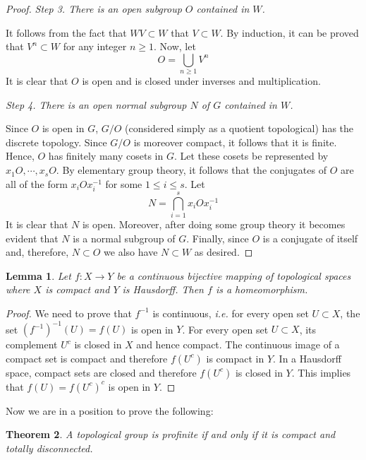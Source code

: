 \documentclass[12pt]{article}
\newtheorem{thm}{Theorem}[section]
\newtheorem{lem}[thm]{Lemma}
\theoremstyle{definition}
\theoremstyle{remark}
\begin{document}
\begin{proof}
        \noindent\emph{Step 3. There is an open subgroup $O$ contained in $W$.}

        It follows from the fact that $WV \subset W$ that $V \subset W$. By induction, it can be proved that $V^n \subset W$ for any integer $n \geq 1$. Now, let
        $$ O = \bigcup_{n\geq 1} V^n $$
        It is clear that $O$ is open and is closed under inverses and multiplication.

        \noindent\emph{Step 4. There is an open normal subgroup $N$ of $G$ contained in $W$.}
        
        Since $O$ is open in $G$, $G/O$ (considered simply as a quotient topological) has the discrete topology. Since $G/O$ is moreover compact, it follows that it is finite. Hence, $O$ has finitely many cosets in $G$. Let these cosets be represented by $x_1O,\cdots,x_sO$. By elementary group theory, it follows that the conjugates of $O$ are all of the form $x_iOx_i^{-1}$ for some $1\leq i\leq s$. Let
        $$ N = \bigcap_{i=1}^s x_iOx_i^{-1} $$
        It is clear that $N$ is open. Moreover, after doing some group theory it becomes evident that $N$ is a normal subgroup of $G$. Finally, since $O$ is a conjugate of itself and, therefore, $N\subset O$ we also have $N\subset W$ as desired.
    \end{proof}

    \begin{lem}\label{lem:chb}
        Let $f\colon X\to Y$ be a continuous bijective mapping of topological spaces where $X$ is compact and $Y$ is Hausdorff. Then $f$ is a homeomorphism.
    \end{lem}

    \begin{proof}
        We need to prove that $f^{-1}$ is continuous, \emph{i.e.} for every open set $U\subset X$, the set $(f^{-1})^{-1}(U)=f(U)$ is open in $Y$. For every open set $U\subset X$, its complement $U^c$ is closed in $X$ and hence compact. The continuous image of a compact set is compact and therefore $f(U^c)$ is compact in $Y$. In a Hausdorff space, compact sets are closed and therefore $f(U^c)$ is closed in $Y$. This implies that $f(U)=f(U^c)^c$ is open in $Y$.
    \end{proof}

    Now we are in a position to prove the following:

    \begin{thm}
        A topological group is profinite if and only if it is compact and totally disconnected.        
    \end{thm}
\end{document}

